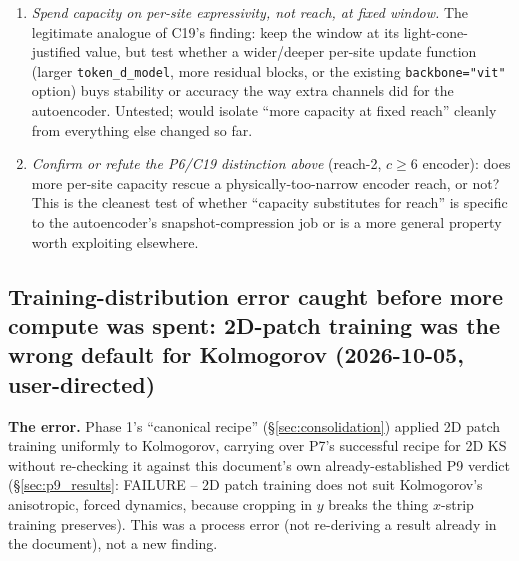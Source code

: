 \documentclass[11pt]{article}
\begin{document}
\begin{enumerate}[leftmargin=*]
  4 new unit tests (known-mode recovery, differentiability, the
  nonzero-reach assertion, and an end-to-end training smoke test); 402
  related tests pass. \textbf{Not yet evaluated against real data} --
  queued as the 2D KS ablation below.
\item \emph{Spend capacity on per-site expressivity, not reach, at fixed
  window.} The legitimate analogue of C19's finding: keep the window at
  its light-cone-justified value, but test whether a wider/deeper
  per-site update function (larger \texttt{token\_d\_model}, more
  residual blocks, or the existing \texttt{backbone="vit"} option) buys
  stability or accuracy the way extra channels did for the autoencoder.
  Untested; would isolate ``more capacity at fixed reach'' cleanly from
  everything else changed so far.
\item \emph{Confirm or refute the P6/C19 distinction above} (reach-2,
  $c{\ge}6$ encoder): does more per-site capacity rescue a
  physically-too-narrow encoder reach, or not? This is the cleanest test
  of whether ``capacity substitutes for reach'' is specific to the
  autoencoder's snapshot-compression job or is a more general property
  worth exploiting elsewhere.
\end{enumerate}

\subsection{Training-distribution error caught before more compute was spent:
2D-patch training was the wrong default for Kolmogorov (2026-10-05, user-directed)}
\label{sec:kolmogorov_training_redirect}

\textbf{The error.} Phase 1's ``canonical recipe'' (\S\ref{sec:consolidation}) applied 2D
patch training uniformly to Kolmogorov, carrying over P7's successful
recipe for 2D KS without re-checking it against this document's own
already-established P9 verdict (\S\ref{sec:p9_results}: FAILURE -- 2D
patch training does not suit Kolmogorov's anisotropic, forced dynamics,
because cropping in $y$ breaks the thing $x$-strip training preserves).
This was a process error (not re-deriving a result already in the
document), not a new finding.
\end{document}
